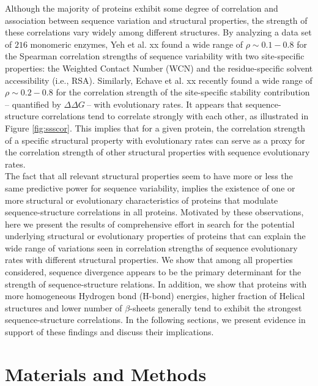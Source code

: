\documentclass[12pt]{article}
\newcommand{\ddg}{$\Delta\Delta G~$}
\begin{document}
    Although the majority of proteins exhibit some degree of correlation and association between sequence variation and structural properties, the strength of these correlations vary widely among different structures. By analyzing a data set of $216$ monomeric enzymes, {\color{red}Yeh et al. xx} found a wide range of $\rho\sim0.1-0.8$ for the Spearman correlation strengths of sequence variability with two site-specific properties: the Weighted Contact Number (WCN) and the residue-specific solvent accessibility (i.e., RSA). Similarly, {\color{red}Echave et al. xx} recently found a wide range of $\rho\sim0.2-0.8$ for the correlation strength of the site-specific stability contribution -- quantified by \ddg -- with evolutionary rates. It appears that sequence-structure correlations tend to correlate strongly with each other, as illustrated in Figure \ref{fig:ssscor}. This implies that for a given protein, the correlation strength of a specific structural property with evolutionary rates can serve as a proxy for the correlation strength of other structural properties with sequence evolutionary rates.
    \\

    The fact that all relevant structural properties seem to have more or less the same predictive power for sequence variability, implies the existence of one or more structural or evolutionary characteristics of proteins that modulate sequence-structure correlations in all proteins. Motivated by these observations, here we present the results of comprehensive effort in search for the potential underlying structural or evolutionary properties of proteins that can explain the wide range of variations seen in correlation strengths of sequence evolutionary rates with different structural properties.  We show that among all properties considered, sequence divergence appears to be the primary determinant for the strength of sequence-structure relations. In addition, we show that proteins with more homogeneous Hydrogen bond (H-bond) energies, higher fraction of Helical structures and lower number of $\beta$-sheets generally tend to exhibit the strongest sequence-structure correlations. In the following sections, we present evidence in support of these findings and discuss their implications. %
    \\


\section{Materials and Methods}
\label{sec:mam}
\end{document}
